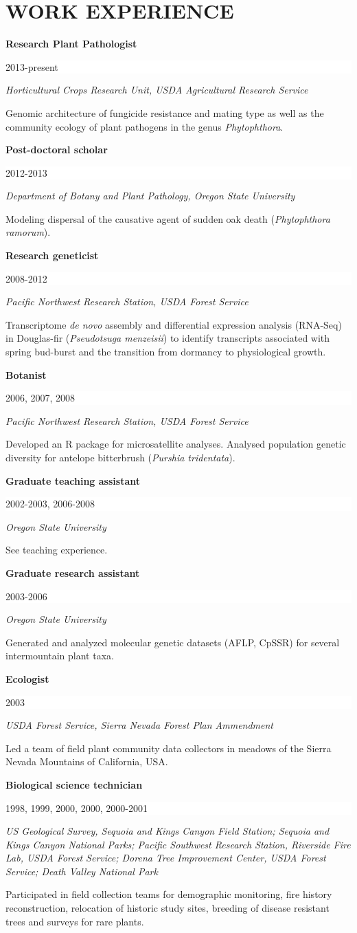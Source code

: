 \documentclass{article}
\newcommand{\NewPart}[1]{\section*{\uppercase{#1}}}
\newcommand{\WorkEntry}[4]{
		\noindent \textbf{#1} \hfill %
		\colorbox{White}{%
			\parbox{24em}{%
			\hfill\color{Black}#2}} \par	%
		\noindent \textit{#3}\par %
		\noindent \small #4 \par %
		\normalsize \par
		\vspace{6 pt}}
\begin{document}
\NewPart{Work experience}{}

\WorkEntry{Research Plant Pathologist}{2013-present}{Horticultural Crops Research Unit, USDA Agricultural Research Service}{Genomic architecture of fungicide resistance and mating type as well as the community ecology of plant pathogens in the genus \emph{Phytophthora}.}

\WorkEntry{Post-doctoral scholar}{2012-2013}{Department of Botany and Plant Pathology, Oregon State University}{Modeling dispersal of the causative agent of sudden oak death (\emph{Phytophthora ramorum}).}

\WorkEntry{Research geneticist}{2008-2012}{Pacific Northwest Research Station, USDA Forest Service}{Transcriptome \emph{de novo} assembly and differential expression analysis (RNA-Seq) in Douglas-fir (\emph{Pseudotsuga menzeisii}) to identify transcripts associated with spring bud-burst and the transition from dormancy to physiological growth.}

\WorkEntry{Botanist}{2006, 2007, 2008}{Pacific Northwest Research Station, USDA Forest Service}{Developed an R package for microsatellite analyses. Analysed population genetic diversity for antelope bitterbrush (\emph{Purshia tridentata}).}

\WorkEntry{Graduate teaching assistant}{2002-2003, 2006-2008}
{Oregon State University}{See teaching experience.}



\WorkEntry{Graduate research assistant}{2003-2006}
{Oregon State University}{Generated and analyzed molecular genetic datasets (AFLP, CpSSR) for several intermountain plant taxa.}

\WorkEntry{Ecologist}{2003}
{USDA Forest Service, Sierra Nevada Forest Plan Ammendment}{Led a team of field plant community data collectors in meadows of the Sierra Nevada Mountains of California, USA.}


\WorkEntry{Biological science technician}{1998, 1999, 2000, 2000, 2000-2001}{US Geological Survey, Sequoia and Kings Canyon Field Station; Sequoia and Kings Canyon National Parks; Pacific Southwest Research Station, Riverside Fire Lab, USDA Forest Service; Dorena Tree Improvement Center, USDA Forest Service; Death Valley National Park}{Participated in field collection teams for demographic monitoring, fire history reconstruction, relocation of historic study sites, breeding of disease resistant trees and surveys for rare plants.}
\end{document}
